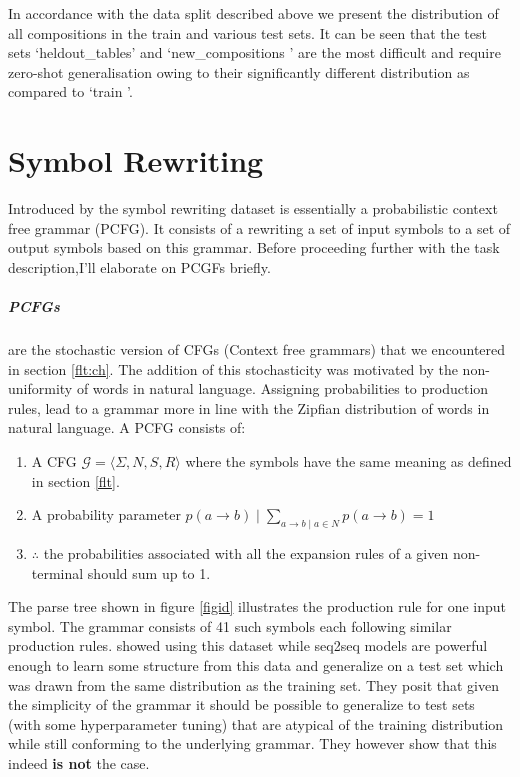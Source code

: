 In accordance with the data split described above we present the distribution of all compositions in the train and various test sets. It can be seen that the test sets \lq heldout\_tables\rq{} and \lq new\_compositions \rq{} are the most difficult and require zero-shot generalisation owing to their significantly different distribution as compared to \lq train \rq{}.

\section{Symbol Rewriting} \label{datasets:sr}
Introduced by \cite{Weber2018} the symbol rewriting dataset is essentially a probabilistic context free grammar (PCFG). It consists of a rewriting a set of input symbols to a set of output symbols based on this grammar. Before proceeding further with the task description,I'll elaborate on PCGFs briefly.

\subparagraph{PCFGs} are the stochastic version of CFGs (Context free grammars) that we encountered in section \ref{flt:ch}. The addition of this stochasticity was motivated by the non-uniformity of words in natural language. Assigning probabilities to production rules, lead to a grammar more in line with the Zipfian distribution of words in natural language. A PCFG consists of:

\begin{enumerate}
	\item A CFG $\mathcal{G} = \langle \Sigma, N, S, R \rangle$ where the symbols have the same meaning as defined in section \ref{flt}.
	\item A probability parameter $p(a \rightarrow b) \mid \displaystyle \sum_{a \rightarrow b \mid a \in N} p(a \rightarrow b) = 1 $ 
	\item $\therefore$ the probabilities associated with all the expansion rules of a given non-terminal should sum up to 1.
\end{enumerate}

The parse tree shown in figure \ref{figid} illustrates the production rule for one input symbol. The grammar consists of 41 such symbols each following similar production rules. \cite{Weber2018} showed using this dataset while seq2seq models are powerful enough to learn some structure from this data and generalize on a test set which was drawn from the same distribution as the training set. They posit that given the simplicity of the grammar it should be possible to generalize to test sets (with some hyperparameter tuning) that are atypical of the training distribution while still conforming to the underlying grammar. They however show that this indeed \textbf{is not} the case.

